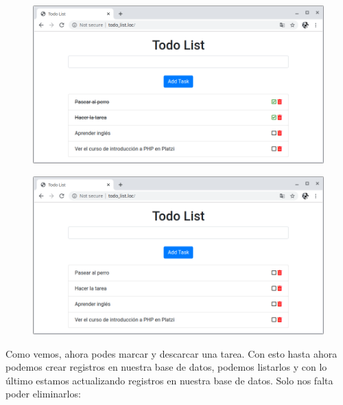 \documentclass{article}
\begin{document}
\begin{figure}[h!]
  \centering
  \includegraphics[scale=0.5]{./Pictures/106_checkFuncional.png}
\end{figure}

\begin{figure}[h!]
  \centering
  \includegraphics[scale=0.5]{./Pictures/107_uncheckFuncional.png}
\end{figure}

Como vemos, ahora podes marcar y descarcar una tarea. Con esto hasta ahora
podemos crear registros en nuestra base de datos, podemos listarlos y con lo
último estamos actualizando registros en nuestra base de datos. Solo nos falta
poder eliminarlos:\\
\end{document}
